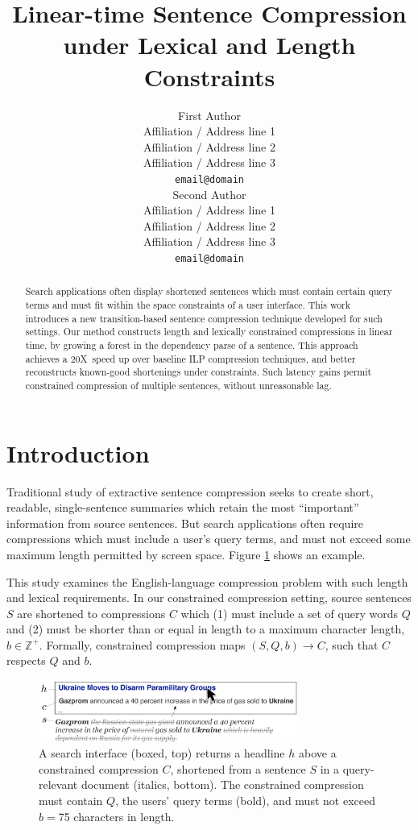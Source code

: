 \documentclass[11pt,a4paper]{article}
\title{Linear-time Sentence Compression under Lexical and Length Constraints}
\author{First Author \\
  Affiliation / Address line 1 \\
  Affiliation / Address line 2 \\
  Affiliation / Address line 3 \\
  {\tt email@domain} \\\And
  Second Author \\
  Affiliation / Address line 1 \\
  Affiliation / Address line 2 \\
  Affiliation / Address line 3 \\
  {\tt email@domain} \\}
\date{}
\newcommand{\speedup}[0]{20X~}
\begin{document}
\maketitle

\begin{abstract}
Search applications often display shortened sentences which must contain certain query terms and must fit within the space constraints of a user interface. This work introduces a new transition-based sentence compression technique developed for such settings. Our method constructs length and lexically constrained compressions in linear time, by growing a forest in the dependency parse of a sentence. This approach achieves a \speedup speed up over baseline ILP compression techniques, and better reconstructs known-good shortenings under constraints. Such latency gains permit constrained compression of multiple sentences, without unreasonable lag.
\end{abstract}


\section{Introduction}\label{s:intro}

Traditional study of extractive sentence compression seeks to create short, readable, single-sentence summaries which retain the most ``important'' information from source sentences. But search applications often require compressions which must include a user's query terms, and must not exceed some maximum length permitted by screen space.  Figure \ref{f:qf} shows an example.

This study examines the English-language compression problem with such length and lexical requirements. In our constrained compression setting, source sentences $S$ are shortened to compressions $C$ which (1) must include a set of query words $Q$ and (2) must be shorter than or equal in length to a maximum character length, $b \in \mathbb{Z}^{+}$. Formally, constrained compression maps $(S,Q,b) \rightarrow C$, such that $C$ respects $Q$ and $b$.

\begin{figure}[htb!]
\includegraphics[width=8.5cm]{qf.pdf}
\caption{A search interface (boxed, top) returns a headline $h$ above a constrained compression $C$, shortened from a sentence $S$ in a query-relevant document (italics, bottom). The constrained compression must contain $Q$, the users' query terms (bold), and must not exceed $b=$75 characters in length.}
\label{f:qf}
\end{figure}
\end{document}
